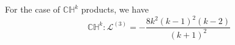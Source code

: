 For the case of $\mathbb{CH}^k$ products, we have
\begin{equation}
    \mathbb{CH}^k:\mathcal{L}^{(3)}=-\frac{8k^2(k-1)^2(k-2)}{(k+1)^2}
\end{equation}



































